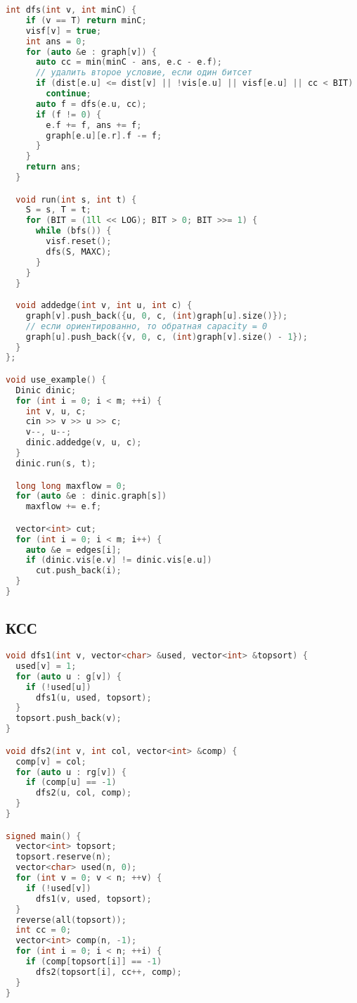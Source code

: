 \documentclass[9pt,a4paper,landscape,twosided]{extarticle}
\begin{document}
\begin{multicols*}{3}
\begin{lstlisting}[language=C++]
  int dfs(int v, int minC) {
    if (v == T) return minC;
    visf[v] = true;
    int ans = 0;
    for (auto &e : graph[v]) {
      auto cc = min(minC - ans, e.c - e.f);
      // удалить второе условие, если один битсет
      if (dist[e.u] <= dist[v] || !vis[e.u] || visf[e.u] || cc < BIT)
        continue;
      auto f = dfs(e.u, cc);
      if (f != 0) {
        e.f += f, ans += f;
        graph[e.u][e.r].f -= f;
      }
    }
    return ans;
  }

  void run(int s, int t) {
    S = s, T = t;
    for (BIT = (1ll << LOG); BIT > 0; BIT >>= 1) {
      while (bfs()) {
        visf.reset();
        dfs(S, MAXC);
      }
    }
  }

  void addedge(int v, int u, int c) {
    graph[v].push_back({u, 0, c, (int)graph[u].size()});
    // если ориентированно, то обратная capacity = 0
    graph[u].push_back({v, 0, c, (int)graph[v].size() - 1});
  }
};

void use_example() {
  Dinic dinic;
  for (int i = 0; i < m; ++i) {
    int v, u, c;
    cin >> v >> u >> c;
    v--, u--;
    dinic.addedge(v, u, c);
  }
  dinic.run(s, t);

  long long maxflow = 0;
  for (auto &e : dinic.graph[s])
    maxflow += e.f;

  vector<int> cut;
  for (int i = 0; i < m; i++) {
    auto &e = edges[i];
    if (dinic.vis[e.v] != dinic.vis[e.u])
      cut.push_back(i);
  }
}
\end{lstlisting}

\subsection{КСС}
\begin{lstlisting}[language=C++]
void dfs1(int v, vector<char> &used, vector<int> &topsort) {
  used[v] = 1;
  for (auto u : g[v]) {
    if (!used[u])
      dfs1(u, used, topsort);
  }
  topsort.push_back(v);
}

void dfs2(int v, int col, vector<int> &comp) {
  comp[v] = col;
  for (auto u : rg[v]) {
    if (comp[u] == -1)
      dfs2(u, col, comp);
  }
}

signed main() {
  vector<int> topsort;
  topsort.reserve(n);
  vector<char> used(n, 0);
  for (int v = 0; v < n; ++v) {
    if (!used[v])
      dfs1(v, used, topsort);
  }
  reverse(all(topsort));
  int cc = 0;
  vector<int> comp(n, -1);
  for (int i = 0; i < n; ++i) {
    if (comp[topsort[i]] == -1)
      dfs2(topsort[i], cc++, comp);
  }
}
\end{lstlisting}


\end{multicols*}
\end{document}
